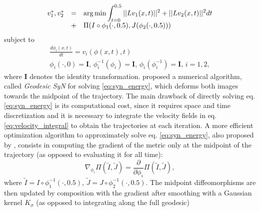 \begin{equation}\label{eq:syn_energy}
    \begin{array}{lll}
        v_{1}^{*}, v_{2}^{*} &=& \mathlarger{\arg \min \int_{t=0}^{0.5} ||L v_{1}(x, t)||^{2} + ||L v_{2}(x, t)||^{2} dt}\\
        &+& \mathlarger{ \Pi(I \circ \phi_{1}(\cdot, 0.5), J(\phi_{2}(\cdot, 0.5)))}
    \end{array}
\end{equation}
subject to
\begin{equation}\label{eq:syn_energy_constraints}
    \begin{array}{l}
        \frac{d\phi_{i}(x, t)}{dt} = v_{i}(\phi(x,t),t)\\
        \phi_{i}(\cdot, 0) = \mathbf{I},\, \phi_{i}^{-1}(\phi_{i}) = \mathbf{I},\, \phi_{i}(\phi_{i}^{-1}) = \mathbf{I},\, i=1,2,
    \end{array}
\end{equation}
where $\mathbf{I}$ denotes the identity transformation. \cite{Avants2006} proposed a numerical algorithm, called \textit{Geodesic SyN} for solving \eqref{eq:syn_energy}, which deforms both images towards the midpoint of the trajectory. The main drawback of directly solving eq. \eqref{eq:syn_energy} is its computational cost, since it requires space and time discretization and it is necessary to integrate the velocity fields in eq. \eqref{eq:velocity_integral} to obtain the trajectories at each iteration. A more efficient optimization algorithm to approximately solve eq. \eqref{eq:syn_energy}, also proposed by \cite{Avants2008, Avants2011}, consists in computing the gradient of the metric only at the midpoint of the trajectory (as opposed to evaluating it for all time):
\begin{equation}\label{eq:grad_metric}
    \nabla_{\phi_{i}} \Pi(\tilde{I}, \tilde{J}) = \frac{\partial}{\partial \phi_{i}} \Pi \left( \tilde{I}, \tilde{J}\right),
\end{equation}
where $\tilde{I} = I \circ \phi_{1}^{-1}(\cdot, 0.5)$, $\tilde{J} = J \circ \phi_{2}^{-1}(\cdot, 0.5)$. The midpoint diffeomorphisms are then updated by composition with the gradient after smoothing with a Gaussian kernel $K_{\sigma}$ (as opposed to integrating along the full geodesic)

